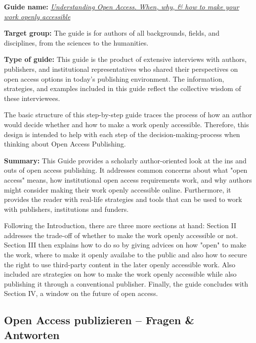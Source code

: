 \documentclass{article}
\begin{document}
\textbf{Guide name: }\emph{\href{https://library.oapen.org/bitstream/handle/20.500.12657/22319/9783966270175_Boehm-Grossmann-Reiche-Schrader_Handbuch-OA-Publikationsworkflow.pdf;jsessionid=63C0F28DE7838F3E3F9C83AAB719B6CE?sequence=1}{Understanding Open Access. When, why, \& how to make your work openly accessible}}\emph{ }\autocite{rubow_understanding_2015}  


\textbf{Target group: }The guide is for authors of all backgrounds, fields, and disciplines, from the sciences to the humanities.


\textbf{Type of guide: }This guide is the product of extensive interviews with authors, publishers, and institutional representatives who shared their perspectives on open access options in today’s publishing environment. The information, strategies, and examples included in this guide reflect the collective wisdom of these interviewees.


The basic structure of this step-by-step guide traces the process of how an author would decide whether and how to make a work openly accessible. Therefore, this design is intended to help with each step of the decision-making-process when thinking about Open Access Publishing. 


\textbf{Summary: }This Guide provides a scholarly author-oriented look at the ins and outs of open access publishing. It addresses common concerns about what "open access" means, how institutional open access requirements work, and why authors might consider making their work openly accessible online. Furthermore, it provides the reader with real-life strategies and tools that can be used to work with publishers, institutions and funders.


Following the Introduction, there are three more sections at hand: Section II addresses the trade-off of whether to make the work openly accessible or not. Section III then explains how to do so by giving advices on how "open" to make the work, where to make it openly availabe to the public and also how to secure the right to use third-party content in the later openly accessible work. Also included are strategies on how to make the work openly accessible while also publishing it through a conventional publisher. Finally, the guide concludes with Section IV, a window on the future of open access.


\subsection{Open Access publizieren – Fragen \& Antworten}\label{H4741497}
\end{document}
